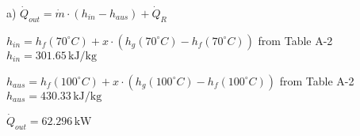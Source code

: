 a)  
\( \dot{Q}_{out} = \dot{m} \cdot (h_{in} - h_{aus}) + \dot{Q}_R \)  

\( h_{in} = h_f(70^\circ C) + x \cdot (h_g(70^\circ C) - h_f(70^\circ C)) \) from Table A-2  
\( h_{in} = 301.65 \, \text{kJ/kg} \)  

\( h_{aus} = h_f(100^\circ C) + x \cdot (h_g(100^\circ C) - h_f(100^\circ C)) \) from Table A-2  
\( h_{aus} = 430.33 \, \text{kJ/kg} \)  

\( \dot{Q}_{out} = 62.296 \, \text{kW} \)